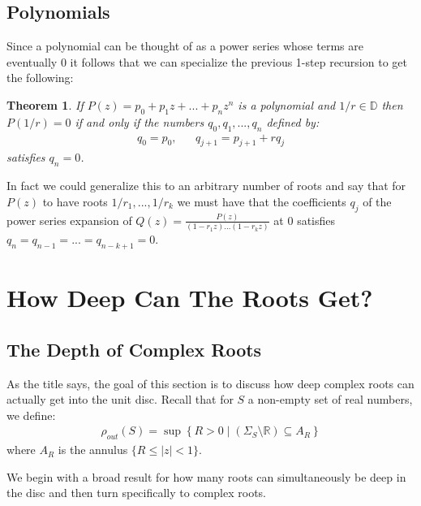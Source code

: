 \documentclass[11pt]{amsart}
\newtheorem{theorem}{Theorem}
\numberwithin{theorem}{section} %
\numberwithin{corollary}{section}
\numberwithin{lemma}{section}
\numberwithin{proposition}{section}
\numberwithin{definition}{section}
\begin{document}
\subsection{Polynomials}
Since a polynomial can be thought of as a power series whose terms are eventually $0$ it follows that we can specialize the previous 1-step recursion to get the following:

\begin{theorem}
If $P(z) = p_0 + p_1z + ... + p_nz^n$ is a polynomial and $1/r \in \mathbb{D}$ then $P(1/r) = 0$ if and only if the numbers $q_0, q_1, ..., q_{n}$ defined by:
\begin{align*}
q_0 = p_0, & & q_{j+1} = p_{j+1} + rq_j
\end{align*}
satisfies $q_n = 0$.
\end{theorem}

In fact we could generalize this to an arbitrary number of roots and say that for $P(z)$ to have roots $1/r_1, ..., 1/r_k$ we must have that the coefficients $q_j$ of the power series expansion of $Q(z) = \frac{P(z)}{(1-r_1z)...(1-r_kz)}$ at $0$ satisfies $q_n = q_{n-1} = ... = q_{n-k+1} = 0$.





















\section{How Deep Can The Roots Get?}

\subsection{The Depth of Complex Roots}

As the title says, the goal of this section is to discuss how deep complex roots can actually get into the unit disc. Recall that for $S$ a non-empty set of real numbers, we define:
\begin{align*}
\rho_{out}(S) = \sup \left\{ R > 0 \mid (\Sigma_S\setminus \mathbb{R}) \subseteq A_R \right\}
\end{align*}
where $A_R$ is the annulus $\{ R \leqslant |z| < 1 \}$.

We begin with a broad result for how many roots can simultaneously be deep in the disc and then turn specifically to complex roots.
\end{document}
